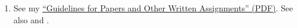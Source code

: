 \documentclass[titlepage]{article}
\begin{document}
\begin{enumerate}
\begin{enumerate}
		\item See my \href{https://danieldriver.com/assets/pdf/handouts/Guidelines_for_Papers.pdf}{“Guidelines for Papers and Other Written Assignments” (PDF)}.
		See also \cite[chs. 3, 5, 8, 11]{rlgs} and \cite{sbl2}.

	\end{enumerate}



\end{enumerate}
\end{document}
